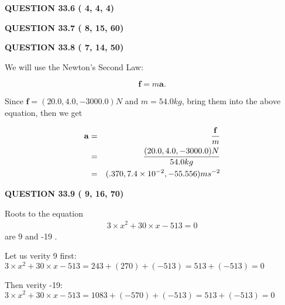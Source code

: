 \documentclass[12pt]{article}
\begin{document}
 
 
  
\vspace{0.2in}
  
{\textbf{\Large{QUESTION
33.6 
 (          4,          4,          4)
}}}
  
  
  
\vspace{0.2in}
  
{\textbf{\Large{QUESTION
33.7 
 (          8,         15,         60)
}}}
  
  
 
 

 
 
  
\vspace{0.2in}
  
{\textbf{\Large{QUESTION
33.8 
 (          7,         14,         50)
}}}
  
  
 
 

We will use the Newton's Second Law:
 
\[
\mathbf{f}=m\mathbf{a}.
\]
 
Since $\mathbf{f}= %
(20.0 , 4.0 , -3000.0) N$
and $m= %
54.0kg$, bring them into the above equation, then we get
 
\begin{eqnarray*}
\mathbf{a}&=&\frac{\mathbf{f}}m  \\
&=&\frac{ %
(20.0 , 4.0 , -3000.0) N}{ %
54.0kg}  \\
&=& %
(.370 , 7.4 \times 10^{-2} , -55.556) ms^{-2}
\end{eqnarray*}
 
 
 
  
\vspace{0.2in}
  
{\textbf{\Large{QUESTION
33.9 
 (          9,         16,         70)
}}}
  
  


 
 

Roots to the equation
\begin{eqnarray*}
3 \times x^2  %
+  %
30
                 \times x    %
-513 =0
\end{eqnarray*}
are  %
9 and  %
-19 .
 
Let us verity  %
9 first:
$  %
3 \times x^2  %
+  %
30
                 \times x    %
-513
  = %
243+( %
270)+( %
-513)
  = %
513+( %
-513)
  = %
0
$
 
Then verity  %
-19:
$  %
3 \times x^2  %
+  %
30
                 \times x    %
-513
  = %
1083+( %
-570)+( %
-513)
  = %
513+( %
-513)
  = %
0
$
 
\end{document}
